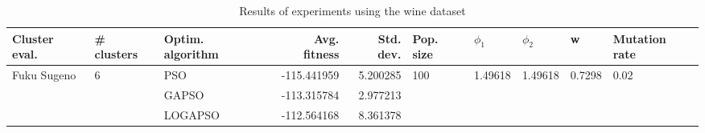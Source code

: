 \begin{table}
\centering
\caption{Results of experiments using the wine dataset}
\begin{tabular}{lllrrlllll}
\toprule
               Cluster eval. &        \# clusters & Optim. algorithm &  Avg. fitness &  Std. dev. &            Pop. size &               $\phi_{1}$ &               $\phi_{2}$ &                       w &         Mutation rate \\
\midrule
\multirow{3}{*}{Fuku Sugeno} & \multirow{3}{*}{6} &              PSO &   -115.441959 &   5.200285 & \multirow{3}{*}{100} & \multirow{3}{*}{1.49618} & \multirow{3}{*}{1.49618} & \multirow{3}{*}{0.7298} & \multirow{3}{*}{0.02} \\
                             &                    &            GAPSO &   -113.315784 &   2.977213 &                      &                          &                          &                         &                       \\
                             &                    &          LOGAPSO &   -112.564168 &   8.361378 &                      &                          &                          &                         &                       \\
\bottomrule
\end{tabular}
\end{table}
